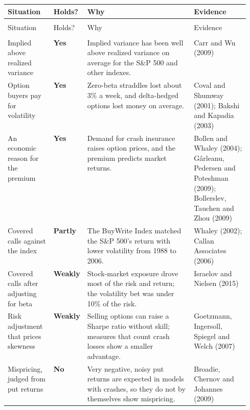 {\small
\begin{longtable}{@{}>{\raggedright\arraybackslash}p{0.19\linewidth}>{\raggedright\arraybackslash}p{0.13\linewidth}>{\raggedright\arraybackslash}p{}>{\raggedright\arraybackslash}p{0.23\linewidth}@{}}
\toprule
Situation & Holds? & Why & Evidence \\
\midrule
\endfirsthead
\multicolumn{4}{@{}l}{\emph{(continued)}} \\
\toprule
Situation & Holds? & Why & Evidence \\
\midrule
\endhead
\midrule
\multicolumn{4}{r@{}}{\emph{(continued on the next page)}} \\
\endfoot
\bottomrule
\endlastfoot
Implied above realized variance & \textbf{Yes} & Implied variance has been well above realized variance on average for the S\&P 500 and other indexes. & Carr and Wu (2009) \\*
\addlinespace[3pt]
Option buyers pay for volatility & \textbf{Yes} & Zero-beta straddles lost about 3\% a week, and delta-hedged options lost money on average. & Coval and Shumway (2001); Bakshi and Kapadia (2003) \\
\addlinespace[3pt]
An economic reason for the premium & \textbf{Yes} & Demand for crash insurance raises option prices, and the premium predicts market returns. & Bollen and Whaley (2004); G\^arleanu, Pedersen and Poteshman (2009); Bollerslev, Tauchen and Zhou (2009) \\
\addlinespace[3pt]
Covered calls against the index & \textbf{Partly} & The BuyWrite Index matched the S\&P 500's return with lower volatility from 1988 to 2006. & Whaley (2002); Callan Associates (2006) \\
\addlinespace[3pt]
Covered calls after adjusting for beta & \textbf{Weakly} & Stock-market exposure drove most of the risk and return; the volatility bet was under 10\% of the risk. & Israelov and Nielsen (2015) \\
\addlinespace[3pt]
Risk adjustment that prices skewness & \textbf{Weakly} & Selling options can raise a Sharpe ratio without skill; measures that count crash losses show a smaller advantage. & Goetzmann, Ingersoll, Spiegel and Welch (2007) \\*
\addlinespace[3pt]
Mispricing, judged from put returns & \textbf{No} & Very negative, noisy put returns are expected in models with crashes, so they do not by themselves show mispricing. & Broadie, Chernov and Johannes (2009) \\
\end{longtable}
\addtocounter{table}{-1}%
}


